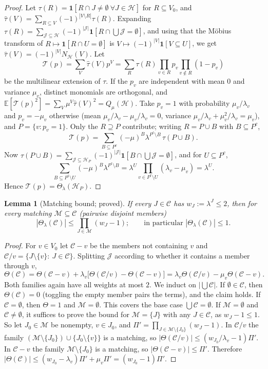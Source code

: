 \documentclass[11pt,reqno]{amsart}
\newtheorem{lemma}[theorem]{Lemma}
\theoremstyle{definition}
\newcommand{\E}{\mathbb E}
\newcommand{\Ho}{\mathcal H}
\newcommand{\cM}{\mathcal M}
\newcommand{\cC}{\mathcal C}
\begin{document}
\begin{proof}
Let $\tau(R)=\mathbf 1[R\cap J\ne\emptyset\ \forall J\in\Ho]$ for $R\subseteq V_0$, and
$\hat\tau(V)=\sum_{R\subseteq V}(-1)^{|V\setminus R|}\tau(R)$.  Expanding
$\tau(R)=\sum_{\mathcal J\subseteq\Ho}(-1)^{|\mathcal J|}\mathbf 1[R\cap\bigcup\mathcal J=\emptyset]$,
and using that the M\"obius transform of $R\mapsto\mathbf 1[R\cap U=\emptyset]$ is
$V\mapsto(-1)^{|V|}\mathbf 1[V\subseteq U]$, we get $\hat\tau(V)=(-1)^{|V|}N_\Ho(V)$.  Let
\[
 \mathcal T(p)=\sum_V\hat\tau(V)p^V=\sum_R\tau(R)\prod_{v\in R}p_v\prod_{v\notin R}(1-p_v)
\]
be the multilinear extension of $\tau$.  If the $p_v$ are independent with
mean $0$ and variance $\mu_v$, distinct monomials are orthogonal, and
$\E[\mathcal T(p)^2]=\sum_V\mu^V\hat\tau(V)^2=Q_\mu(\Ho)$.  Take $p_v=1$ with
probability $\mu_v/\lambda_v$ and $p_v=-\mu_v$ otherwise (mean
$\mu_v/\lambda_v-\mu_v/\lambda_v=0$, variance $\mu_v/\lambda_v+\mu_v^2/\lambda_v=\mu_v$), and
$P=\{v:p_v=1\}$.  Only the $R\supseteq P$ contribute; writing $R=P\cup B$ with
$B\subseteq P^c$,
\[
 \mathcal T(p)=\sum_{B\subseteq P^c}(-\mu)^B\lambda^{P^c\setminus B}\,\tau(P\cup B).
\]
Now $\tau(P\cup B)=\sum_{\mathcal J\subseteq\Ho_P}(-1)^{|\mathcal J|}\mathbf 1[B\cap\bigcup\mathcal J=\emptyset]$,
and for $U\subseteq P^c$,
\[
 \sum_{B\subseteq P^c\setminus U}(-\mu)^B\lambda^{P^c\setminus B}=\lambda^U\prod_{v\in P^c\setminus U}(\lambda_v-\mu_v)=\lambda^U .
\]
Hence $\mathcal T(p)=\Theta_\lambda(\Ho_P)$.
\end{proof}

\begin{lemma}[Matching bound; proved]\label{lem:theta}
If every $J\in\cC$ has $w_J:=\lambda^J\le2$, then for every matching
$\cM\subseteq\cC$ (pairwise disjoint members)
\[
 |\Theta_\lambda(\cC)|\le\prod_{J\in\cM}(w_J-1);\qquad\text{in particular }|\Theta_\lambda(\cC)|\le1 .
\]
\end{lemma}

\begin{proof}
For $v\in V_0$ let $\cC-v$ be the members not containing $v$ and
$\cC/v=\{J\setminus\{v\}:\ J\in\cC\}$.  Splitting $\mathcal J$ according to whether
it contains a member through $v$,
\[
 \Theta(\cC)=\Theta(\cC-v)+\lambda_v\big[\Theta(\cC/v)-\Theta(\cC-v)\big]=\lambda_v\Theta(\cC/v)-\mu_v\Theta(\cC-v).
\]
Both families again have all weights at most $2$.  We induct on
$|\bigcup\cC|$.  If $\emptyset\in\cC$, then $\Theta(\cC)=0$ (toggling the empty
member pairs the terms), and the claim holds.  If $\cC=\emptyset$, then
$\Theta=1$ and $\cM=\emptyset$.  This covers the base case $\bigcup\cC=\emptyset$.  If
$\cM=\emptyset$ and $\cC\ne\emptyset$, it suffices to prove the bound for $\cM=\{J\}$
with any $J\in\cC$, as $w_J-1\le1$.  So let $J_0\in\cM$ be nonempty, $v\in J_0$,
and $\Pi'=\prod_{J\in\cM\setminus\{J_0\}}(w_J-1)$.  In $\cC/v$ the family
$(\cM\setminus\{J_0\})\cup\{J_0\setminus\{v\}\}$ is a matching, so
$|\Theta(\cC/v)|\le(w_{J_0}/\lambda_v-1)\Pi'$.  In $\cC-v$ the family
$\cM\setminus\{J_0\}$ is a matching, so $|\Theta(\cC-v)|\le\Pi'$.  Therefore
$|\Theta(\cC)|\le(w_{J_0}-\lambda_v)\Pi'+\mu_v\Pi'=(w_{J_0}-1)\Pi'$.
\end{proof}
\end{document}
